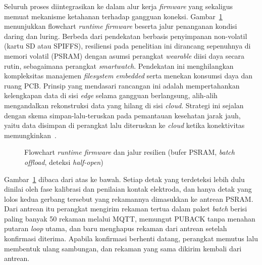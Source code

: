 Seluruh proses diintegrasikan ke dalam alur kerja \textit{firmware} yang sekaligus memuat mekanisme ketahanan terhadap gangguan koneksi. Gambar~\ref{fig:alir-firmware} menunjukkan flowchart \textit{runtime firmware} beserta jalur penanganan kondisi daring dan luring. Berbeda dari pendekatan berbasis penyimpanan non-volatil (kartu SD atau SPIFFS), resiliensi pada penelitian ini dirancang sepenuhnya di memori volatil (PSRAM) dengan asumsi perangkat \textit{wearable} diisi daya secara rutin, sebagaimana perangkat \textit{smartwatch}. Pendekatan ini menghilangkan kompleksitas manajemen \textit{filesystem embedded} serta menekan konsumsi daya dan ruang PCB. Prinsip yang mendasari rancangan ini adalah mempertahankan kelengkapan data di sisi \textit{edge} selama gangguan berlangsung, alih-alih mengandalkan rekonstruksi data yang hilang di sisi \textit{cloud}. Strategi ini sejalan dengan skema simpan-lalu-teruskan pada pemantauan kesehatan jarak jauh, yaitu data disimpan di perangkat lalu diteruskan ke \textit{cloud} ketika konektivitas memungkinkan~\cite{yaacoub_2020}.

\begin{figure}[H]
  \centering
  \caption{Flowchart \textit{runtime firmware} dan jalur resilien (bufer PSRAM, \textit{batch offload}, deteksi \textit{half-open})}
  \label{fig:alir-firmware}
\end{figure}

Gambar~\ref{fig:alir-firmware} dibaca dari atas ke bawah. Setiap detak yang terdeteksi lebih dulu dinilai oleh fase kalibrasi dan penilaian kontak elektroda, dan hanya detak yang lolos kedua gerbang tersebut yang rekamannya dimasukkan ke antrean PSRAM. Dari antrean itu perangkat mengirim rekaman tertua dalam paket \textit{batch} berisi paling banyak 50 rekaman melalui MQTT, memungut PUBACK tanpa menahan putaran \textit{loop} utama, dan baru menghapus rekaman dari antrean setelah konfirmasi diterima. Apabila konfirmasi berhenti datang, perangkat memutus lalu membentuk ulang sambungan, dan rekaman yang sama dikirim kembali dari antrean.

